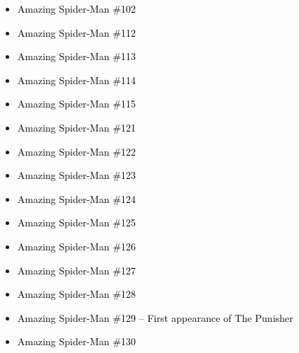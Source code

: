 \documentclass[12pt]{article}
\newcommand{\checkbox}{\raisebox{0.0ex}{\fbox{\rule{0ex}{1.5ex} \rule{1.5ex}{0ex}}}}
\begin{document}
\begin{center}
\begin{tcolorbox}[colback=white!95!gray, colframe=black, width=0.9\textwidth, arc=4mm, auto outer arc, boxrule=0.8pt]
\begin{itemize}[left=0pt,label={\checkbox}]
    \item \textcolor{black}{Amazing Spider-Man \#102}
    \item \textcolor{black}{Amazing Spider-Man \#112}
    \item \textcolor{black}{Amazing Spider-Man \#113}
    \item \textcolor{black}{Amazing Spider-Man \#114}
    \item \textcolor{black}{Amazing Spider-Man \#115}
    \item \textcolor{black}{Amazing Spider-Man \#121}
    \item \textcolor{black}{Amazing Spider-Man \#122}
    \item \textcolor{black}{Amazing Spider-Man \#123}
    \item \textcolor{black}{Amazing Spider-Man \#124}
    \item \textcolor{black}{Amazing Spider-Man \#125}
    \item \textcolor{black}{Amazing Spider-Man \#126}
    \item \textcolor{black}{Amazing Spider-Man \#127}
    \item \textcolor{black}{Amazing Spider-Man \#128}
    \item \textcolor{black}{Amazing Spider-Man \#129 -- First appearance of The Punisher}
    \item \textcolor{black}{Amazing Spider-Man \#130}
\end{itemize}
\end{tcolorbox}
\end{center}
\end{document}
